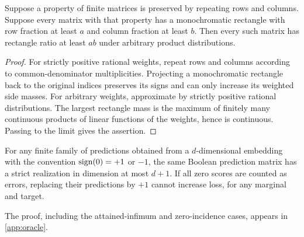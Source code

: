 \begin{lemma}\label{lem:product-weights}
Suppose a property of finite matrices is preserved by repeating rows and columns. Suppose every matrix with that property has a monochromatic rectangle with row fraction at least $a$ and column fraction at least $b$. Then every such matrix has rectangle ratio at least $ab$ under arbitrary product distributions.
\end{lemma}
\begin{proof}
For strictly positive rational weights, repeat rows and columns according to common-denominator multiplicities. Projecting a monochromatic rectangle back to the original indices preserves its signs and can only increase its weighted side masses. For arbitrary weights, approximate by strictly positive rational distributions. The largest rectangle mass is the maximum of finitely many continuous products of linear functions of the weights, hence is continuous. Passing to the limit gives the assertion.
\end{proof}

\begin{lemma}\label{lem:ties}
For any finite family of predictions obtained from a $d$-dimensional embedding with the convention $\operatorname{sign}(0)=+1$ or $-1$, the same Boolean prediction matrix has a strict realization in dimension at most $d+1$. If all zero scores are counted as errors, replacing their predictions by $+1$ cannot increase loss, for any marginal and target.
\end{lemma}
\noindent The proof, including the attained-infimum and zero-incidence cases, appears in \cref{app:oracle}.
